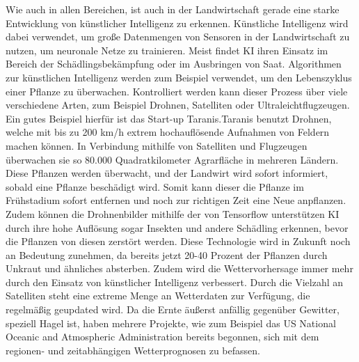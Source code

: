 Wie auch in allen Bereichen, ist auch in der Landwirtschaft gerade eine
starke Entwicklung von künstlicher Intelligenz zu erkennen. Künstliche
Intelligenz wird dabei verwendet, um große Datenmengen von Sensoren in der
Landwirtschaft zu nutzen, um neuronale Netze zu trainieren. Meist findet KI
ihren Einsatz im Bereich der Schädlingsbekämpfung oder im Ausbringen von
Saat.\cite{mci/Mohr2020} Algorithmen zur künstlichen Intelligenz werden zum
Beispiel verwendet, um den Lebenszyklus einer Pflanze zu überwachen.
Kontrolliert werden kann dieser Prozess über viele verschiedene Arten, zum
Beispiel Drohnen, Satelliten oder Ultraleichtflugzeugen. Ein gutes Beispiel
hierfür ist das Start-up Taranis.Taranis benutzt Drohnen, welche mit bis zu
200 km/h extrem hochauflösende Aufnahmen von Feldern machen können. In
Verbindung mithilfe von Satelliten und Flugzeugen überwachen sie so 80.000
Quadratkilometer Agrarfläche in mehreren Ländern. Diese Pflanzen werden
überwacht, und der Landwirt wird sofort informiert, sobald eine Pflanze
beschädigt wird. Somit kann dieser die Pflanze im Frühstadium sofort entfernen
und noch zur richtigen Zeit eine Neue anpflanzen. Zudem können die
Drohnenbilder mithilfe der von Tensorflow unterstützen KI durch ihre hohe
Auflösung sogar Insekten und andere Schädling erkennen, bevor die Pflanzen von
diesen zerstört werden. Diese Technologie wird in Zukunft noch an Bedeutung
zunehmen, da bereits jetzt 20-40 Prozent der Pflanzen durch Unkraut und
ähnliches absterben. Zudem wird die Wettervorhersage immer mehr durch den
Einsatz von künstlicher Intelligenz verbessert. Durch die Vielzahl an
Satelliten steht eine extreme Menge an Wetterdaten zur Verfügung, die
regelmäßig geupdated wird. Da die Ernte äußerst anfällig gegenüber Gewitter,
speziell Hagel ist, haben mehrere Projekte, wie zum Beispiel das US National
Oceanic and Atmospheric Administration bereits begonnen, sich mit dem regionen-
und zeitabhängigen Wetterprognosen zu befassen.\cite{wennker2020kunstliche}
